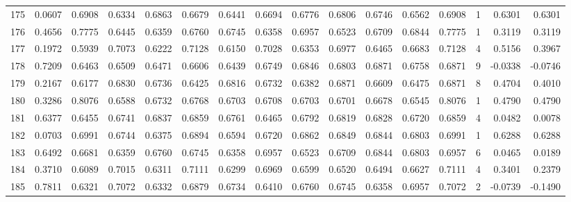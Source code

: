 \begin{tabular}{lrrrrrrrrrrrrrrr}
175 &      0.0607 &  0.6908 &  0.6334 &  0.6863 &  0.6679 &  0.6441 &  0.6694 &  0.6776 &  0.6806 &  0.6746 &   0.6562 &     0.6908 &      1 &                    0.6301 &                     0.6301 \\
176 &      0.4656 &  0.7775 &  0.6445 &  0.6359 &  0.6760 &  0.6745 &  0.6358 &  0.6957 &  0.6523 &  0.6709 &   0.6844 &     0.7775 &      1 &                    0.3119 &                     0.3119 \\
177 &      0.1972 &  0.5939 &  0.7073 &  0.6222 &  0.7128 &  0.6150 &  0.7028 &  0.6353 &  0.6977 &  0.6465 &   0.6683 &     0.7128 &      4 &                    0.5156 &                     0.3967 \\
178 &      0.7209 &  0.6463 &  0.6509 &  0.6471 &  0.6606 &  0.6439 &  0.6749 &  0.6846 &  0.6803 &  0.6871 &   0.6758 &     0.6871 &      9 &                   -0.0338 &                    -0.0746 \\
179 &      0.2167 &  0.6177 &  0.6830 &  0.6736 &  0.6425 &  0.6816 &  0.6732 &  0.6382 &  0.6871 &  0.6609 &   0.6475 &     0.6871 &      8 &                    0.4704 &                     0.4010 \\
180 &      0.3286 &  0.8076 &  0.6588 &  0.6732 &  0.6768 &  0.6703 &  0.6708 &  0.6703 &  0.6701 &  0.6678 &   0.6545 &     0.8076 &      1 &                    0.4790 &                     0.4790 \\
181 &      0.6377 &  0.6455 &  0.6741 &  0.6837 &  0.6859 &  0.6761 &  0.6465 &  0.6792 &  0.6819 &  0.6828 &   0.6720 &     0.6859 &      4 &                    0.0482 &                     0.0078 \\
182 &      0.0703 &  0.6991 &  0.6744 &  0.6375 &  0.6894 &  0.6594 &  0.6720 &  0.6862 &  0.6849 &  0.6844 &   0.6803 &     0.6991 &      1 &                    0.6288 &                     0.6288 \\
183 &      0.6492 &  0.6681 &  0.6359 &  0.6760 &  0.6745 &  0.6358 &  0.6957 &  0.6523 &  0.6709 &  0.6844 &   0.6803 &     0.6957 &      6 &                    0.0465 &                     0.0189 \\
184 &      0.3710 &  0.6089 &  0.7015 &  0.6311 &  0.7111 &  0.6299 &  0.6969 &  0.6599 &  0.6520 &  0.6494 &   0.6627 &     0.7111 &      4 &                    0.3401 &                     0.2379 \\
185 &      0.7811 &  0.6321 &  0.7072 &  0.6332 &  0.6879 &  0.6734 &  0.6410 &  0.6760 &  0.6745 &  0.6358 &   0.6957 &     0.7072 &      2 &                   -0.0739 &                    -0.1490 \\

\end{tabular}
